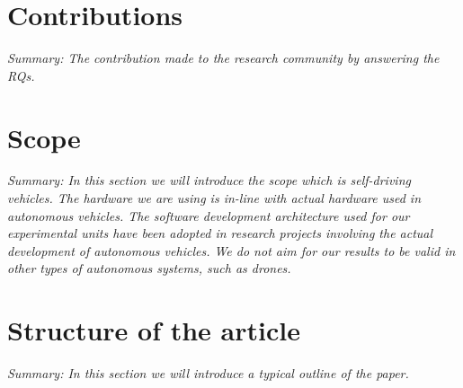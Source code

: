 \section{Contributions}
\textit{Summary: The contribution made to the research community by answering the RQs.} 


\section{Scope}
\textit{Summary: In this section we will introduce the scope which is self-driving vehicles. The hardware we are using is in-line with actual hardware used in autonomous vehicles. The software development architecture used for our experimental units have been adopted in research projects involving the actual development of autonomous vehicles. We do not aim for our results to be valid in other types of autonomous systems, such as drones. }

\section{Structure of the article}

\textit{Summary: In this section we will introduce a typical outline of the paper.}


	